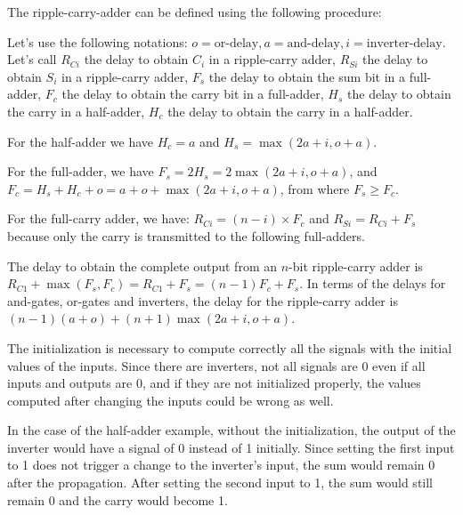 \begin{exe}[3.30]
    The ripple-carry-adder can be defined using the following procedure:

    Let’s use the following notations: $o = \textrm{or-delay}, 
    a = \textrm{and-delay}, i = \textrm{inverter-delay}$.
    Let’s call $R_{Ci}$ the delay to obtain $C_i$ in a ripple-carry adder, 
    $R_{Si}$ the delay to obtain $S_i$ in a ripple-carry adder, $F_s$ the delay 
    to obtain the sum bit in a full-adder, $F_c$ the delay to obtain the carry 
    bit in a full-adder, $H_s$ the delay to obtain the carry in a half-adder, 
    $H_c$ the delay to obtain the carry in a half-adder.

    For the half-adder we have $H_c = a$ and
    $H_s = \max(2a + i, o + a)$.

    For the full-adder, we have $F_s = 2 H_s = 2 \max(2a + i, o + a)$, and $F_c 
    = H_s + H_c + o = a + o + \max(2a + i, o + a)$, from where
    $F_s \geq F_c$.

    For the full-carry adder, we have:
    $R_{Ci} = (n - i) \times F_c$ and $R_{Si} = R_{Ci} + F_s$ because only the 
    carry is transmitted to the following full-adders.

    The delay to obtain the complete output from an $n$-bit ripple-carry adder 
    is $R_{C1} + \max(F_s, F_c) = R_{C1} + F_s = (n - 1) F_c + F_s$. In terms of 
    the delays for and-gates, or-gates and inverters, the delay for the 
    ripple-carry adder is
    $ (n - 1) (a + o) + (n + 1) \max(2a + i, o + a) $.
\end{exe}

\begin{exe}[3.31]
    The initialization is necessary to compute correctly all the signals with 
    the initial values of the inputs. Since there are inverters, not all signals 
    are 0 even if all inputs and outputs are 0, and if they are not initialized 
    properly, the values computed after changing the inputs could be wrong as 
    well.

    In the case of the half-adder example, without the initialization, the 
    output of the inverter would have a signal of 0 instead of 1 initially. 
    Since setting the first input to 1 does not trigger a change to the 
    inverter’s input, the sum would remain 0 after the propagation. After 
    setting the second input to 1, the sum would still remain 0 and the carry 
    would become 1.
\end{exe}

